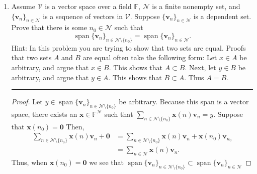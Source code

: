 \documentclass[12pt]{amsart}
\newcommand{\1}{\mathbbm{1}}
\numberwithin{equation}{section}
\numberwithin{Theorem}{section}
\theoremstyle{plain} %
\theoremstyle{definition}
\theoremstyle{remark}
\begin{document}
\begin{enumerate}[1.]
\begin{proof}
Thus we see that if $\mathbf{x}(n_0)\neq0$ then $\mathbf{v}_{n_{0}}$ could be written as a linear combination in $\sum\limits_{n\in\mathcal{N}_{0}}\mathbf{x}(n)\mathbf{v}_{n}$. 
However, since $\mathbf{v}_{n_{0}}$ is not in $\operatorname{span}\{\mathbf{v}_{n}\}_{n\in\mathcal{N}_{0}}$ we conclude that $\mathbf{x}(n_0)=0$ and therefore $\sum\limits_{n\in\mathcal{N}}\mathbf{x}(n)\mathbf{v}_{n}$ is also linearly independent.
\end{proof}


\newpage

\item Assume \(\mathcal{V}\) is a vector space over a field \(\mathbb{F}\), \(\mathcal{N}\) is a finite nonempty set, and \(\{\mathbf{v}_{n}\}_{n\in\mathcal{N}}\) is a sequence of vectors in \(\mathcal{V}\). Suppose \(\{\mathbf{v}_{n}\}_{n\in\mathcal{N}}\) is a dependent set.  Prove that there is some \(n_{0}\in\mathcal{N}\) such that
\[\operatorname{span}\{\mathbf{v}_{n}\}_{n\in\mathcal{N}\setminus\{n_{0}\}} = \operatorname{span}\{\mathbf{v}_{n}\}_{n\in\mathcal{N}}.\]
Hint: In this problem you are trying to show that two sets are equal. Proofs that two sets \(A\) and \(B\) are equal often take the following form: Let \(x\in A\) be arbitrary, and argue that \(x\in B\). This shows that \(A\subset B\). Next, let \(y\in B\) be arbitrary, and argue that \(y\in A\). This shows that \(B\subset A\). Thus \(A=B\). \\
\hrule
\bigskip

\begin{proof}

Let $y\in \operatorname{span}\{\mathbf{v}_{n}\}_{n\in\mathcal{N}\setminus\{n_{0}\}} $ be arbitrary.
Because this span is a vector space, there exists an $\textbf{x}\in\mathbb{F}^\mathcal{N}$ such that
$\sum\limits_{n\in\mathcal{N}\setminus\{n_0\}}\mathbf{x}(n)\mathbf{v}_{n} = y$.
Suppose that $\mathbf{x}(n_0) = \textbf{0}$ Then,
\begin{align*}
	\sum\limits_{n\in\mathcal{N}\setminus\{n_0\}}\mathbf{x}(n)\mathbf{v}_{n} + \textbf{0} &= 
	\sum\limits_{n\in\mathcal{N}\setminus\{n_0\}}\mathbf{x}(n)\mathbf{v}_{n} + \mathbf{x}(n_0)\mathbf{v}_{n_0} \\
	&= \sum\limits_{n\in\mathcal{N}}\mathbf{x}(n)\mathbf{v}_{n}.
\end{align*}
Thus, when $\mathbf{x}(n_0) = \textbf{0}$ we see that $\operatorname{span}\{\mathbf{v}_{n}\}_{n\in\mathcal{N}\setminus\{n_{0}\}} \subset \operatorname{span}\{\mathbf{v}_{n}\}_{n\in\mathcal{N}}$


\end{proof}
\end{enumerate}
\end{document}

